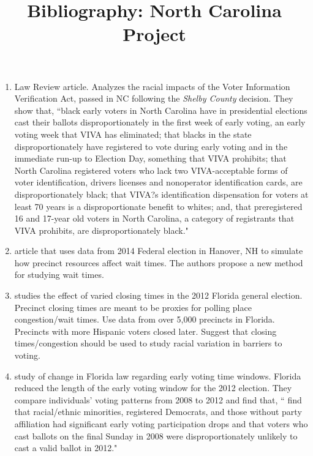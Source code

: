 \documentclass[12pt]{article}
\title{Bibliography: North Carolina Project}
\begin{document}
\maketitle

\begin{enumerate}

\item \citet{herron2015race} Law Review article. Analyzes the racial impacts of the Voter Information Verification Act, passed in NC following the \textit{Shelby County} decision. They show that, ``black early voters in North Carolina have in presidential elections cast their ballots disproportionately in the first week of early voting, an early voting week that VIVA has eliminated; that blacks in the state disproportionately have registered to vote during early voting and in the immediate run-up to Election Day, something that VIVA prohibits; that North Carolina registered voters who lack two VIVA-acceptable forms of voter identification, drivers licenses and nonoperator identification cards, are disproportionately black; that VIVA?s identification dispensation for voters at least 70 years is a disproportionate benefit to whites; and, that preregistered 16 and 17-year old voters in North Carolina, a category of registrants that VIVA prohibits, are disproportionately black." 

\item \citet{herron2016precinct} article that uses data from 2014 Federal election in Hanover, NH to simulate how precinct resources affect wait times. The authors propose a new method for studying wait times. 

\item \citet{herron2015precinct} studies the effect of varied closing times in the 2012 Florida general election. Precinct closing times are meant to be proxies for polling place congestion/wait times. Use data from over 5,000 precincts in Florida. Precincts with more Hispanic voters closed later. Suggest that closing times/congestion should be used to study racial variation in barriers to voting. 

\item \citet{herron2014race} study of change in Florida law regarding early voting time windows. Florida reduced the length of the early voting window for the 2012 election. They compare individuals' voting patterns from 2008 to 2012 and find that, `` find that racial/ethnic minorities, registered Democrats, and those without party affiliation had significant early voting participation drops and that voters who cast ballots on the final Sunday in 2008 were disproportionately unlikely to cast a valid ballot in 2012." 


\end{enumerate}
\end{document}
